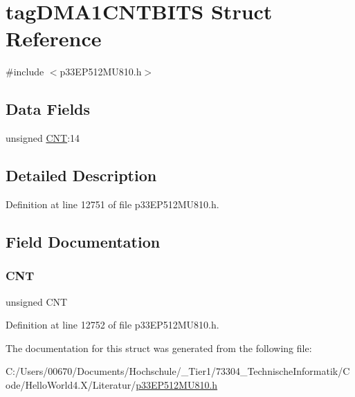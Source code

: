\hypertarget{structtag_d_m_a1_c_n_t_b_i_t_s}{}\section{tag\+D\+M\+A1\+C\+N\+T\+B\+I\+TS Struct Reference}
\label{structtag_d_m_a1_c_n_t_b_i_t_s}


{\ttfamily \#include $<$p33\+E\+P512\+M\+U810.\+h$>$}

\subsection*{Data Fields}
\begin{DoxyCompactItemize}
\item 
unsigned \hyperlink{structtag_d_m_a1_c_n_t_b_i_t_s_a30be39d82c244f19fd98dd74227487f6}{C\+NT}\+:14
\end{DoxyCompactItemize}


\subsection{Detailed Description}


Definition at line 12751 of file p33\+E\+P512\+M\+U810.\+h.



\subsection{Field Documentation}
\mbox{\label{structtag_d_m_a1_c_n_t_b_i_t_s_a30be39d82c244f19fd98dd74227487f6}} 
\subsubsection{\texorpdfstring{C\+NT}{CNT}}
{\footnotesize\ttfamily unsigned C\+NT}



Definition at line 12752 of file p33\+E\+P512\+M\+U810.\+h.



The documentation for this struct was generated from the following file\+:\begin{DoxyCompactItemize}
\item 
C\+:/\+Users/00670/\+Documents/\+Hochschule/\+\_\+\+Tier1/73304\+\_\+\+Technische\+Informatik/\+Code/\+Hello\+World4.\+X/\+Literatur/\hyperlink{p33_e_p512_m_u810_8h}{p33\+E\+P512\+M\+U810.\+h}\end{DoxyCompactItemize}
